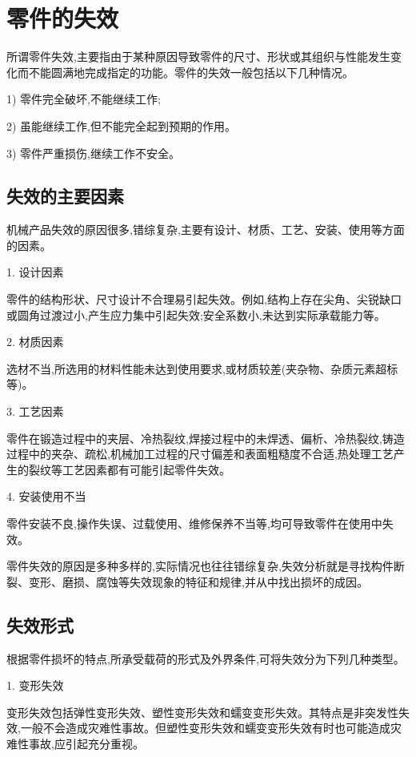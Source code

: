 \documentclass[UTF8]{ctexbook}
\newcommand{\◎}{\ensuremath{\bigcirc}}
\begin{document}
\section{零件的失效}

所谓零件失效,主要指由于某种原因导致零件的尺寸、形状或其组织与性能发生变化而不能圆满地完成指定的功能。零件的失效一般包括以下几种情况。

1) 零件完全破坏,不能继续工作;

2) 虽能继续工作,但不能完全起到预期的作用。

3) 零件严重损伤,继续工作不安全。

\subsection{失效的主要因素}

机械产品失效的原因很多,错综复杂,主要有设计、材质、工艺、安装、使用等方面的因素。

1. 设计因素

零件的结构形状、尺寸设计不合理易引起失效。例如,结构上存在尖角、尖锐缺口或圆角过渡过小,产生应力集中引起失效;安全系数小,未达到实际承载能力等。

2. 材质因素

选材不当,所选用的材料性能未达到使用要求,或材质较差(夹杂物、杂质元素超标等)。

3. 工艺因素

零件在锻造过程中的夹层、冷热裂纹,焊接过程中的未焊透、偏析、冷热裂纹,铸造过程中的夹杂、疏松,机械加工过程的尺寸偏差和表面粗糙度不合适,热处理工艺产生的裂纹等工艺因素都有可能引起零件失效。

4. 安装使用不当

零件安装不良,操作失误、过载使用、维修保养不当等,均可导致零件在使用中失效。

零件失效的原因是多种多样的,实际情况也往往错综复杂,失效分析就是寻找构件断裂、变形、磨损、腐蚀等失效现象的特征和规律,并从中找出损坏的成因。

\subsection{失效形式}

根据零件损坏的特点,所承受载荷的形式及外界条件,可将失效分为下列几种类型。

1. 变形失效

变形失效包括弹性变形失效、塑性变形失效和蠕变变形失效。其特点是非突发性失效,一般不会造成灾难性事故。但塑性变形失效和蠕变变形失效有时也可能造成灾难性事故,应引起充分重视。
\end{document}
